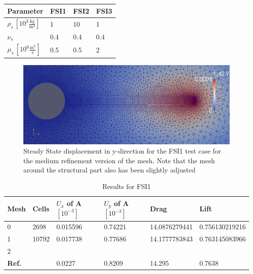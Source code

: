 \begin{table}[!h]
\begin{center}
  \begin{tabular}{|l | l | l | l|} \hline
	Parameter & FSI1 & FSI2 & FSI3 \\ \hline
    $\rho_s \,[10^3\frac{\text{kg}}{\text{m}^3}]$  & 1 & 10 & 1 \\   \hline
    $\nu_s $ & 0.4 & 0.4 & 0.4 \\ \hline
    $\mu_s \,[10^{6}\frac{\text{m}^2}{\text{s}}]$ & 0.5 & 0.5 & 2   \\ \hline \hline
  \end{tabular}
\end{center}
\end{table}
\begin{center}
\begin{figure}[!h]
\includegraphics[width=\linewidth]{figures/FSI1_mesh_med}
\caption{Steady State displacement in y-direction for the FSI1 test case for the medium refinement version of the mesh. Note that the mesh around the structural part also has been slightly adjusted}
\end{figure}
\end{center}


\begin{table}[!h]
\begin{center}
  \begin{tabular}{|l | l | l | l | l | l|} \hline
	Mesh & Cells & $U_x$ of A $[10^{-3}]$ & $U_y$ of A $[10^{-3}]$ & Drag & Lift\\ \hline
    0  & 2698 & 0.015596 & 0.74221 & 14.0876279441 & 0.756130219216 \\   \hline
    1 & 10792 & 0.017738 & 0.77686 & 14.1777783843 & 0.763145083966 \\ \hline
    2 &  & $ $&  $ $ & $ $ & $ $   \\ \hline \hline
    \textbf{Ref.}  & & 0.0227 & 0.8209 & 14.295 & 0.7638\\ \hline 
    \hline
  \end{tabular}	
\caption{Results for FSI1}
\end{center}
\end{table}

